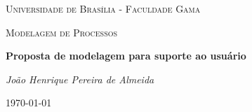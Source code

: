 \documentclass[11pt,a4paper]{article}
\begin{document}
\begin{titlepage}
	\centering
	{\scshape\LARGE Universidade de Brasília - Faculdade Gama\par}
	\vspace{1cm}
	{\scshape\Large Modelagem de Processos\par}
	\vspace{1.5cm}
	{\huge\bfseries Proposta de modelagem para suporte ao usuário\par}
	\vspace{2cm}
	{\Large\itshape João Henrique Pereira de Almeida\par}
	\vfill

	\vfill

	{\large \today\par}
\end{titlepage}


\tableofcontents
\listoffigures
\listoftables

\clearpage













\appendix
\begin{appendices}


\clearpage

\end{appendices}
\end{document}
